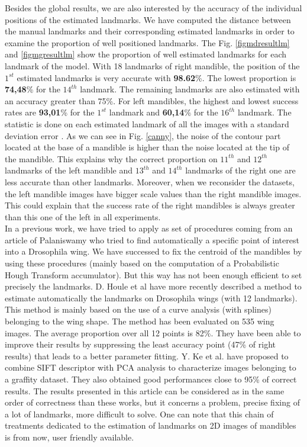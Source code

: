 \documentclass[twoside,twocolumn,10pt]{article}
\begin{document}
Besides the global results, we are also interested by the accuracy of
the individual positions of the estimated landmarks.
We have computed the distance between the manual landmarks and their
corresponding estimated landmarks in order to examine the proportion
of well positioned landmarks. The Fig. \ref{figmdresultlm} and
\ref{figmgresultlm} show the proportion of well estimated landmarks
for each landmark of the model. With 18 landmarks of right mandible,
the position of the $1^{st}$ estimated landmarks is very accurate with
\textbf{98.62}\%. The lowest proportion is \textbf{74,48}\% for the
$14^{th}$ landmark. The remaining landmarks are also estimated with an
accuracy greater than 75\%. For left mandibles, the highest and lowest success rates are
\textbf{93,01}\% for the $1^{st}$ landmark and \textbf{60,14}\% for
the $16^{th}$ landmark. The statistic is done on each estimated
landmark of all the images with a standard deviation error
\cite{bland1996statistics}. As we can see in Fig. \ref{canny}, the
noise of the contour part located at the base of a mandible is higher
than the noise located at the tip of the mandible.
This explains why the correct proportion on $11^{th}$ and $12^{th}$
landmarks of the left mandible and $13^{th}$ and $14^{th}$ landmarks of
the right one are less accurate than other landmarks. Moreover,
when we reconsider the datasets, the left mandible images have bigger
scale values than the right mandible images. This could explain that the
success rate of the right mandibles is always greater than this one of the left
in all experiments.
\\
In  a previous work, we have tried to apply as set of procedures
coming from an article of Palaniswamy \cite{palaniswamy2010automatic} who tried to find
automatically a specific point of interest into a Drosophila wing. We
have successed to fix the centroid of the mandibles by using these
procedures (mainly based on the computation of a Probabilistic Hough
Transform accumulator). But this way has not been enough efficient to set
precisely the landmarks. D. Houle et al \cite{houle2003automated}
have more recently described a method to estimate automatically the
landmarks on Drosophila wings (with 12 landmarks). This method is
mainly based on the use of a curve analysis (with splines) belonging
to the wing shape. The method has been evaluated on 535 wing images.
The average proportion over all 12 points is 82\%. They have been able
to improve their results by suppressing the least accuracy point (47\%
of right results) that leads to a better parameter fitting. Y. Ke et
al. \cite{ke2004pca} have proposed to combine SIFT descriptor
with PCA analysis to characterize images belonging to a graffity
dataset. They also obtained good performances close to 95\% of correct
results. The results presented in this article can be considered as in
the same order of correctness than these works, but it concerns a problem, precise fixing of a
lot of landmarks, more difficult to solve. One can note that this chain of
treatments dedicated to the  estimation of landmarks on 2D images of
mandibles is from now, user friendly available.
\end{document}
